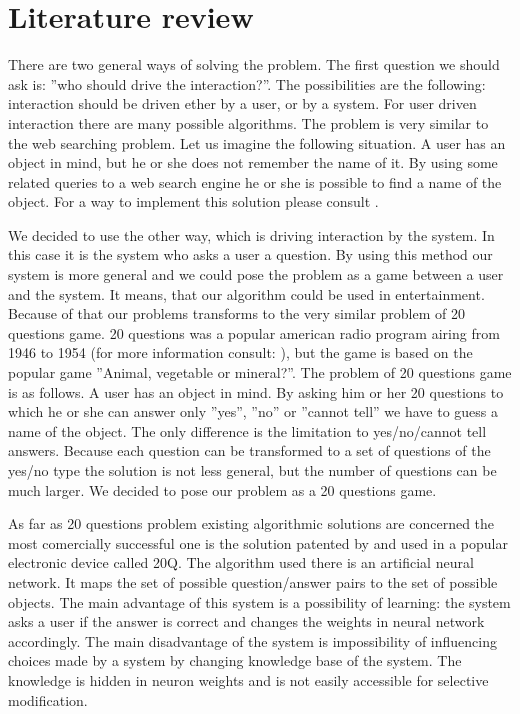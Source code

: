 \documentclass[a4paper]{article}
\begin{document}
\section{Literature review}
There are two general ways of solving the problem. The first question we should ask is: ''who should drive the interaction?''. The possibilities are the following: interaction should be driven ether by a user, or by a system. For user driven interaction there are many possible algorithms. The problem is very similar to the web searching problem. Let us imagine the following situation. A user has an object in mind, but he or she does not remember the name of it. By using some related queries to a web search engine he or she is possible to find a name of the object. For a way to implement this solution please consult \citet{Google}.

We decided to use the other way, which is driving interaction by the system. In this case it is the system who asks a user a question. By using this method our system is more general and we could pose the problem as a game between a user and the system. It means, that our algorithm could be used in entertainment. Because of that our problems transforms to the very similar problem of 20 questions game. 20 questions was a popular american radio program airing from 1946 to 1954 (for more information consult: \citet{Radio}), but the game is based on the popular game ''Animal, vegetable or mineral?''. The problem of 20 questions game is as follows. A user has an object in mind. By asking him or her 20 questions to which he or she can answer only ''yes'', ''no'' or ''cannot tell'' we have to guess a name of the object. The only difference is the limitation to yes/no/cannot tell answers. Because each question can be transformed to a set of questions of the yes/no type the solution is not less general, but the number of questions can be much larger. We decided to pose our problem as a 20 questions game. 

As far as 20 questions problem existing algorithmic solutions are concerned the most comercially successful one is the solution patented by \citet{20Q} and used in a popular electronic device called 20Q. The algorithm used there is an artificial neural network. It maps the set of possible question/answer pairs to the set of possible objects. The main advantage of this system is a possibility of learning: the system asks a user if the answer is correct and changes the weights in neural network accordingly. The main disadvantage of the system is impossibility of influencing choices made by a system by changing knowledge base of the system. The knowledge is hidden in neuron weights and is not easily accessible for selective modification.
\end{document}

